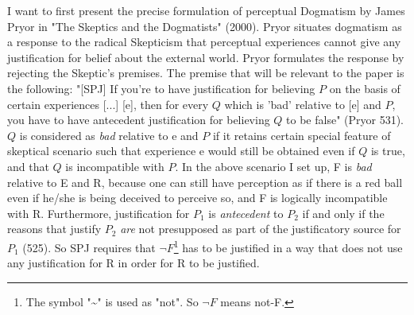 I want to first present the precise formulation of perceptual Dogmatism
by James Pryor in "The Skeptics and the Dogmatists" (2000). Pryor
situates dogmatism as a response to the radical Skepticism that
perceptual experiences cannot give any justification for belief about
the external world. Pryor formulates the response by rejecting the
Skeptic's premises. The premise that will be relevant to the paper is
the following: "{[}SPJ{]} If you're to have justification for believing
\(P\) on the basis of certain experiences {[}...{]} {[}e{]}, then for
every \(Q\) which is 'bad' relative to {[}e{]} and \(P\), you have to
have antecedent justification for believing \(Q\) to be false" (Pryor
531). \(Q\) is considered as \emph{bad} relative to e and \(P\) if it
retains certain special feature of skeptical scenario such that
experience e would still be obtained even if \(Q\) is true, and that
\(Q\) is incompatible with \(P\). In the above scenario I set up, F is
\emph{bad} relative to E and R, because one can still have perception as
if there is a red ball even if he/she is being deceived to perceive so,
and F is logically incompatible with R. Furthermore, justification for
\(P_{1}\) is \emph{antecedent} to \(P_{2}\) if and only if the reasons
that justify \(P_{2}\) \emph{are} not presupposed as part of the
justificatory source for \(P_{1}\) (525). So SPJ requires that
$\neg F$\footnote{The symbol "\textasciitilde{}" is used as
  "not". So $\neg F$ means not-F.} has to be justified in a
way that does not use any justification for R in order for R to be
justified.


